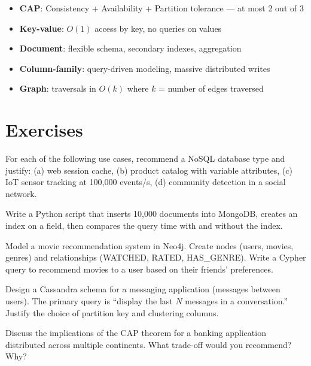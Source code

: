\begin{keyformulas}
\begin{itemize}
  \item \textbf{CAP}: Consistency + Availability + Partition tolerance --- at most 2 out of 3
  \item \textbf{Key-value}: $O(1)$ access by key, no queries on values
  \item \textbf{Document}: flexible schema, secondary indexes, aggregation
  \item \textbf{Column-family}: query-driven modeling, massive distributed writes
  \item \textbf{Graph}: traversals in $O(k)$ where $k$ = number of edges traversed
\end{itemize}
\end{keyformulas}

\section{Exercises}

\begin{exercise}
For each of the following use cases, recommend a NoSQL database type and
justify: (a) web session cache, (b) product catalog with variable
attributes, (c) IoT sensor tracking at 100,000 events/s, (d) community
detection in a social network.
\end{exercise}

\begin{exercise}
Write a Python script that inserts 10,000 documents into MongoDB, creates
an index on a field, then compares the query time with and without the
index.
\end{exercise}

\begin{exercise}
Model a movie recommendation system in Neo4j. Create nodes (users, movies,
genres) and relationships (WATCHED, RATED, HAS\_GENRE). Write a Cypher
query to recommend movies to a user based on their friends' preferences.
\end{exercise}

\begin{exercise}
Design a Cassandra schema for a messaging application (messages between
users). The primary query is ``display the last $N$ messages in a
conversation.'' Justify the choice of partition key and clustering columns.
\end{exercise}

\begin{exercise}
Discuss the implications of the CAP theorem for a banking application
distributed across multiple continents. What trade-off would you
recommend? Why?
\end{exercise}
